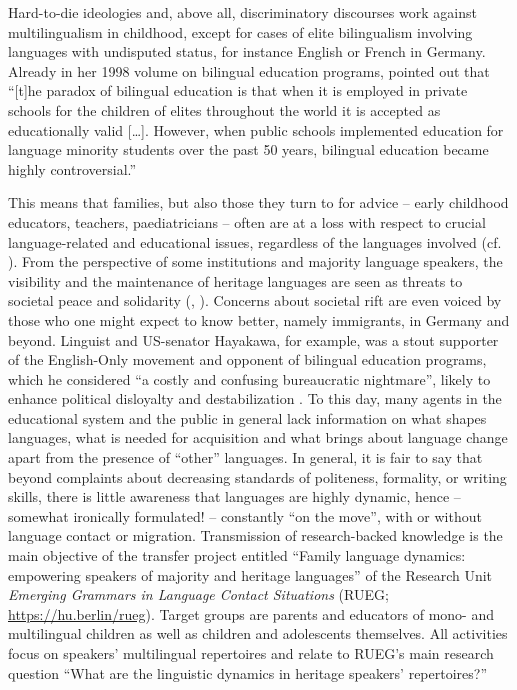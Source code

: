 \documentclass[output=paper,colorlinks,citecolor=brown]{langscibook}
\begin{document}
Hard-to-die ideologies and, above all, discriminatory discourses work against multilingualism in childhood, except for cases of elite bilingualism involving languages with undisputed status, for instance English or French in Germany. Already in her 1998 volume on bilingual education programs, \textcite[1]{Brisk1998} pointed out that ``[t]he paradox of bilingual education is that when it is employed in private schools for the children of elites throughout the world it is accepted as educationally valid […]. However, when public schools implemented education for language minority students over the past 50 years, bilingual education became highly controversial.''

This means that families, but also those they turn to for advice – early childhood educators, teachers, paediatricians – often are at a loss with respect to crucial language-related and educational issues, regardless of the languages involved (cf. \cite{Hopp&al.2010, Edwards2015, Purkarthofer2019}). From the perspective of some institutions and majority language speakers, the visibility and the maintenance of heritage languages are seen as threats to societal peace and solidarity (\cite{Tracy2014}, \cite{Wiese&al.2020}). Concerns about societal rift are even voiced by those who one might expect to know better, namely immigrants, in Germany and beyond. Linguist and US-senator Hayakawa, for example, was a stout supporter of the English-Only movement and opponent of bilingual education programs, which he considered “a costly and confusing bureaucratic nightmare”, likely to enhance political disloyalty and destabilization \parencite[44]{Hayakawa1992}. To this day, many agents in the educational system and the public in general lack information on what shapes languages, what is needed for acquisition and what brings about language change apart from the presence of ``other'' languages. In general, it is fair to say that beyond complaints about decreasing standards of politeness, formality, or writing skills, there is little awareness that languages are highly dynamic, hence – somewhat ironically formulated! – constantly ``on the move'', with or without language contact or migration.
Transmission of research-backed knowledge is the main objective of the transfer project entitled ``Family language dynamics: empowering speakers of majority and heritage languages'' of the Research Unit \textit{Emerging Grammars in Language Contact Situations} (RUEG; \url{https://hu.berlin/rueg}). Target groups are parents and educators of mono- and multilingual children as well as children and adolescents themselves. All activities focus on speakers’ multilingual repertoires and relate to RUEG’s main research question ``What are the linguistic dynamics in heritage speakers’ repertoires?''
\end{document}

